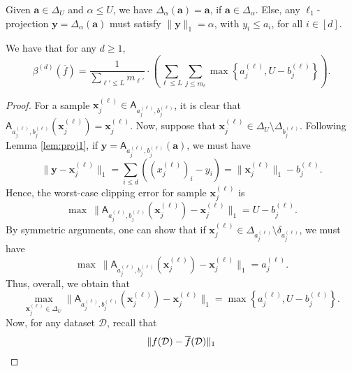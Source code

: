 \documentclass[10pt,a4paper]{amsart}
\begin{document}
\begin{lemma}
	\label{lem:proj1}
	Given $\mathbf{a}\in \Delta_U$ and $\alpha\leq U$, we have $\Delta_\alpha(\mathbf{a}) = \mathbf{a}$, if $\mathbf{a}\in \Delta_{\alpha}$. Else, any $\ell_1$-projection $\mathbf{y} = \Delta_\alpha(\mathbf{a})$ must satisfy $\lVert \mathbf{y}\rVert_1 = \alpha$, with $y_i\leq a_i$, for all $i\in [d]$.
\end{lemma}

\begin{lemma}
	\label{lem:proj2}
	We have that for any $d\geq 1$,
	\[\beta^{(d)}(\overline{f}) = \frac{1}{\sum_{\ell'\leq L} m_{\ell'}}\cdot \left(\sum_{\ell\leq L}\sum_{j\leq m_\ell} \max\left\{a_j^{(\ell)},U-b_j^{(\ell)}\right\}\right).\]
\end{lemma}

\begin{proof}
	For a sample $\mathbf{x}_j^{(\ell)}\in \mathsf{A}_{a_j^{(\ell)},b_j^{(\ell)}}$, it is clear that $\mathsf{A}_{a_j^{(\ell)},b_j^{(\ell)}}(\mathbf{x}_j^{(\ell)}) = \mathbf{x}_j^{(\ell)}$. Now, suppose that $\mathbf{x}_j^{(\ell)}\in \Delta_U\setminus \Delta_{b_j^{(\ell)}}$. Following Lemma \ref{lem:proj1}, if $\mathbf{y} = \mathsf{A}_{a_j^{(\ell)},b_j^{(\ell)}}(\mathbf{a})$, we must have $$\lVert \mathbf{y} - \mathbf{x}_j^{(\ell)}\rVert_1 = \sum_{i\leq d} ((x_j^{(\ell)})_i - y_i) = \lVert \mathbf{x}_j^{(\ell)}\rVert_1 - b_j^{(\ell)}.$$ Hence, the worst-case clipping error for sample $\mathbf{x}_j^{(\ell)}$ is $$\max\ \lVert \mathsf{A}_{a_j^{(\ell)},b_j^{(\ell)}}(\mathbf{x}_j^{(\ell)}) - \mathbf{x}_j^{(\ell)}\rVert_1 = U-b_j^{(\ell)}.$$ By symmetric arguments, one can show that if $\mathbf{x}_j^{(\ell)}\in \Delta_{a_j^{(\ell)}}\setminus \delta_{a_j^{(\ell)}}$, we must have $$\max\ \lVert \mathsf{A}_{a_j^{(\ell)},b_j^{(\ell)}}(\mathbf{x}_j^{(\ell)}) - \mathbf{x}_j^{(\ell)}\rVert_1 = a_j^{(\ell)}.$$ Thus, overall, we obtain that 
	\begin{equation}\max_{\mathbf{x}_j^{(\ell)}\in \Delta_U} \lVert \mathsf{A}_{a_j^{(\ell)},b_j^{(\ell)}}(\mathbf{x}_j^{(\ell)}) - \mathbf{x}_j^{(\ell)}\rVert_1 = \max\left\{a_j^{(\ell)},U-b_j^{(\ell)}\right\}. \label{eq:maxclip}\end{equation} 
	Now, for any dataset $\mathcal{D}$, recall that
	\begin{align}
		&\lVert f(\mathcal{D})-\overline{f}(\mathcal{D})\rVert_1 \notag\\

\end{align}
\end{proof}
\end{document}
